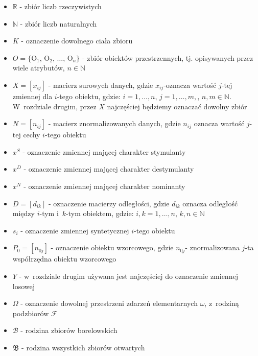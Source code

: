 \documentclass[12pt,a4paper]{report}
\newcommand{\mediana}{\operatorname{med}}
\newcommand{\licznosc}[1]{\overline{\overline{#1}}}
\begin{document}
\begin{itemize}
\item $\mathbb{R}$ - zbiór liczb rzeczywistych
\item $\mathbb{N}$ - zbiór liczb naturalnych
\item $K$ - oznaczenie dowolnego ciała zbioru
\item $O = \{$O$_{1}$, O$_{2}$, $\dots$, O$_{n}\}$ - zbiór obiektów przestrzennych, tj. opisywanych przez wiele atrybutów, $n \in \mathbb{N}$
\item $X=[x_{ij}]$ - macierz surowych danych, gdzie $x_{ij}$-oznacza wartość $j$-tej zmiennej dla $i$-tego obiektu, gdzie: $i=1,\ldots,n$, $j=1,\ldots, m,$, $n,m \in \mathbb{N}$. W~rozdziale drugim, przez $X$ najczęściej będziemy oznaczać dowolny zbiór
\item $N=[n_{ij}]$ - macierz znormalizowanych danych, gdzie $n_{ij}$ oznacza wartość $j$-tej cechy $i$-tego obiektu
\item $x^{S}$ - oznaczenie zmiennej mającej charakter stymulanty
\item $x^{D}$ - oznaczenie zmiennej mającej charakter destymulanty
\item $x^{N}$ - oznaczenie zmiennej mającej charakter nominanty
\item $D=[d_{ik}]$ - oznaczenie macierzy odległości, gdzie $d_{ik}$ oznacza odległość między $i$-tym i~$k$-tym obiektem, gdzie: $i, k=1,\ldots,n$, $k,n \in \mathbb{N}$
\item $s_{i}$ - oznaczenie zmiennej syntetycznej $i$-tego obiektu
\item $P_{0}=[n_{0j}]$ - oznaczenie obiektu wzorcowego, gdzie $n_{0j}$- znormalizowana $j$-ta współrzędna obiektu wzorcowego
\item $Y$ - w~rozdziale drugim używana jest najczęściej do oznaczenie zmiennej losowej
\item $\Omega$ - oznaczenie dowolnej przestrzeni zdarzeń elementarnych $\omega$, z~rodziną podzbiorów $\mathcal{F}$
\item $\mathcal{B}$ - rodzina zbiorów borelowskich
\item $\mathfrak{B}$ - rodzina wszystkich zbiorów otwartych %

\end{itemize}
\end{document}
